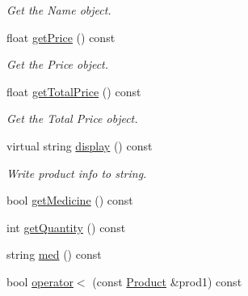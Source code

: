 \begin{DoxyCompactItemize}
\begin{DoxyCompactList}\small\item\em Get the Name object. \end{DoxyCompactList}\item 
float \hyperlink{classProduct_a0aaea95b8d3241b3758246254b8575e2}{get\+Price} () const
\begin{DoxyCompactList}\small\item\em Get the Price object. \end{DoxyCompactList}\item 
float \hyperlink{classProduct_a732aca2574f7a39e3a90837e0240e81f}{get\+Total\+Price} () const
\begin{DoxyCompactList}\small\item\em Get the Total Price object. \end{DoxyCompactList}\item 
virtual string \hyperlink{classProduct_a2f411b12652a6b7b6194fcdbab3a1fb3}{display} () const
\begin{DoxyCompactList}\small\item\em Write product info to string. \end{DoxyCompactList}\item 
bool \hyperlink{classProduct_a3a703454d7777191ad9282b38bce15e1}{get\+Medicine} () const
\item 
int \hyperlink{classProduct_a6a449b90b669aa4380d229b44eca686f}{get\+Quantity} () const
\item 
string \hyperlink{classProduct_aa2ccc7b6aa44a0bf10694b18f910dfa1}{med} () const
\item 
bool \hyperlink{classProduct_add7a6d09de7f21ca5d8a0228461ad6ae}{operator$<$} (const \hyperlink{classProduct}{Product} \&prod1) const
\end{DoxyCompactItemize}
